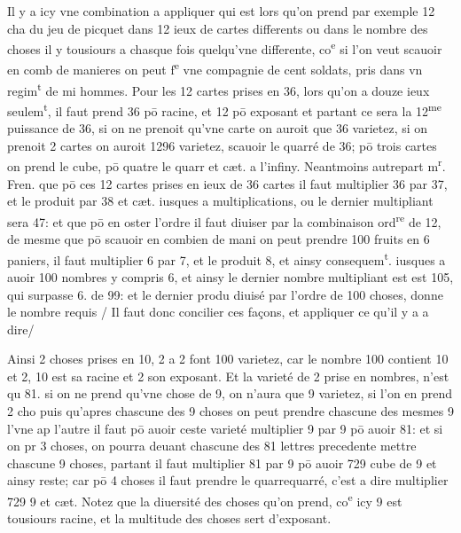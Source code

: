 \documentclass[11pt,a4paper]{article}
\begin{document}
Il y a icy vne combination a appliquer qui est lors qu'on prend par exemple 12 cha\ill{} du jeu de picquet dans 12 ieux de cartes differents ou dans le nombre des choses il y  tousiours a chasque fois quelqu'vne differente, co\textsuperscript{e} si l'on veut scauoir en comb de manieres on peut f\textsuperscript{e} vne compagnie de cent soldats, pris dans vn regim\textsuperscript{t} de mi\ill{} hommes. Pour les 12 cartes prises en 36, lors qu'on a douze ieux seulem\textsuperscript{t}, il faut prend 36 pō racine, et 12 pō exposant et partant ce sera la 12\textsuperscript{me} puissance de 36, si on ne prenoit qu'vne carte on auroit que 36 varietez, si on prenoit 2 cartes on auroit 1296 varietez, scauoir le quarré de 36; pō trois cartes on prend le cube, pō quatre le quarr\ill{} et cæt. a l'infiny. Neantmoins autrepart m\textsuperscript{r}. Fren.  que pō ces 12 cartes prises en \ill{} ieux de 36 cartes il faut multiplier 36 par 37, et le produit par 38 et cæt. iusques a \ill{} multiplications, ou le dernier multipliant sera 47: et que pō en oster l'ordre il faut diuiser par la combinaison ord\textsuperscript{re} de 12, de mesme que pō scauoir en combien de mani\ill{} on peut prendre 100 fruits en 6 paniers, il faut multiplier 6 par 7, et le produit \ill{} 8, et ainsy consequem\textsuperscript{t}. iusques a auoir 100 nombres y compris 6, et ainsy \struck{\ill{}} le dernier nombre multipliant est est 105, qui surpasse 6. de 99: et le dernier produ diuisé par l'ordre de 100 choses, donne le nombre requis / Il faut donc concilier ces façons, et appliquer ce qu'il y a a dire/

 Ainsi 2 choses prises en 10, 2 a 2 font 100 varietez, car le nombre 100 contient 10 et 2, \ill{} 10 est sa racine et 2 son exposant. Et la varieté de 2 prise en  nombres, n'est qu 81. si on ne prend qu'vne chose de 9, on n'aura que 9 varietez, si l'on en prend 2 cho puis qu'apres chascune des 9 choses on peut prendre chascune des mesmes 9 l'vne ap l'autre il faut pō auoir ceste varieté multiplier 9 par 9 pō auoir 81: et si on pr\ill{} 3 choses, on pourra deuant chascune des 81 lettres precedente mettre chascune \ill{} 9 choses, partant il faut multiplier 81 par 9 pō auoir 729 cube de 9 et ainsy \ill{} reste; car pō 4 choses il faut prendre le quarrequarré, c'est a dire multiplier 729 \ill{} 9 et cæt. Notez que la diuersité des choses qu'on prend, co\textsuperscript{e} icy 9 est tousiours racine, et la multitude des choses sert d'exposant.
\end{document}
